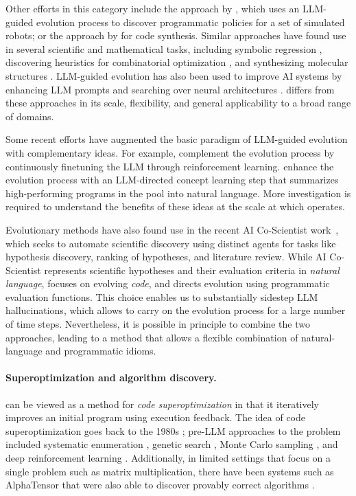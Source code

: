 Other efforts in this category include the approach by \citet{lehman2023evolution}, which uses an LLM-guided evolution process to discover programmatic policies for a set of simulated robots; or the approach by \citet{hemberg2024evolving} for code synthesis.
Similar approaches have found use in several scientific and mathematical tasks, including symbolic regression \citep{shojaee2025llmsr,grayeli2024symbolic}, discovering heuristics for combinatorial optimization \citep{liu2024evolution,ye2024reevo,yao2025multiobjective}, and synthesizing molecular structures \citep{wang2025efficient}.
LLM-guided evolution has also been used to improve AI systems by enhancing LLM prompts \citep{fernando2023promptbreeder} and searching over neural architectures \citep{chen2023evoprompting,morris2024llm}.
\method differs from these approaches in its scale, flexibility, and general applicability to a broad range of domains.

Some recent efforts have augmented the basic paradigm of LLM-guided evolution with complementary ideas.
For example, \citet{surina2025algorithm} complement the evolution process by continuously finetuning the LLM through reinforcement learning.
\citet{grayeli2024symbolic} enhance the evolution process with an LLM-directed concept learning step that summarizes high-performing programs in the pool into natural language.
More investigation is required to understand the benefits of these ideas at the scale at which \method operates. 

Evolutionary methods have also found use in the recent AI Co-Scientist work~\citep{gottweis2025towards}, which seeks to automate scientific discovery using distinct agents for tasks like hypothesis discovery, ranking of hypotheses, and literature review.
While AI Co-Scientist represents scientific hypotheses and their evaluation criteria in \emph{natural language}, \method focuses on evolving \emph{code}, and directs evolution using programmatic evaluation functions.
This choice enables us to substantially sidestep LLM hallucinations, which allows \method to carry on the evolution process for a large number of time steps.
Nevertheless, it is possible in principle to combine the two approaches, leading to a method that allows a flexible combination of natural-language and programmatic idioms. 

\paragraph{Superoptimization and algorithm discovery.}
\method can be viewed as a method for \emph{code superoptimization} in that it iteratively improves an initial program using execution feedback. 
The idea of code superoptimization goes back to the 1980s \citep{Massalin87}; pre-LLM approaches to the problem included systematic enumeration \citep{Massalin87}, genetic search \citep{cooper2002adaptive}, Monte Carlo sampling \citep{schkufza2013stochastic}, and deep reinforcement learning \citep{mankowitz2023faster}.
Additionally, in limited settings that focus on a single problem such as matrix multiplication, there have been systems such as AlphaTensor that were also able to discover provably correct algorithms \citep{fawzi2022discovering}.

